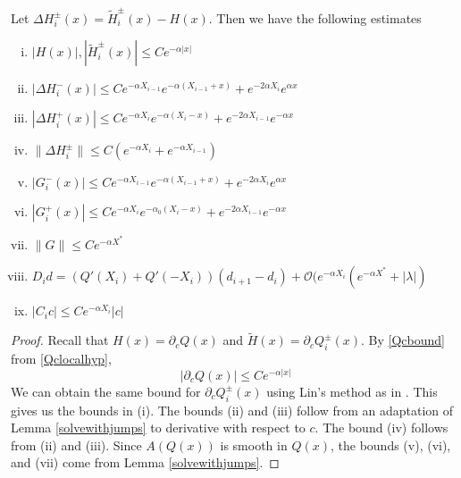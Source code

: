 \documentclass[thesis.tex]{subfiles}
\begin{document}
\begin{lemma}\label{stabestimateslemma}
Let $\Delta H_i^\pm(x) = \tilde{H}_i^\pm(x) - H(x)$. Then we have the following estimates
\begin{enumerate}[(i)]
\item $|H(x)|, |\tilde{H}_i^\pm(x)| \leq C e^{-\alpha |x|}$
\item $|\Delta H_i^-(x)| \leq C e^{-\alpha X_{i-1}} e^{-\alpha(X_{i-1} + x) } + e^{-2 \alpha X_i} e^{\alpha x}$
\item $|\Delta H_i^+(x)| \leq C e^{-\alpha X_i} e^{-\alpha(X_i - x) } + e^{-2 \alpha X_{i-1}} e^{-\alpha x}$
\item $\|\Delta H_i^\pm\| \leq C(e^{-\alpha X_i} + e^{-\alpha X_{i-1}} )$
\item $|G_i^-(x)| \leq C e^{-\alpha X_{i-1}} e^{-\alpha(X_{i-1} + x) } + e^{-2 \alpha X_i} e^{\alpha x}$
\item $|G_i^+(x)| \leq C e^{-\alpha X_i} e^{-\alpha_0(X_i - x) } + e^{-2 \alpha X_{i-1}} e^{-\alpha x}$
\item $\|G\| \leq C e^{-\alpha X^*}$
\item $D_i d = ( Q'(X_i) + Q'(-X_i))(d_{i+1} - d_i ) + \mathcal{O} ( e^{-\alpha X_i} (e^{-\alpha X^*} + |\lambda| )$
\item $|C_i c| \leq C e^{-\alpha X_i} |c|$
\end{enumerate}
\begin{proof}
Recall that $H(x) = \partial_c Q(x)$ and $\tilde{H}(x) = \partial_c Q_i^\pm(x)$. By \cref{Qcbound} from \cref{Qclocalhyp},
\begin{equation}\label{Qcbound1}
|\partial_c Q(x)| \leq C e^{-\alpha|x|}
\end{equation}
We can obtain the same bound for $\partial_c Q_i^\pm(x)$ using Lin's method as in \cite{SandstedeStrut,Sandstede1993}. This gives us the bounds in (i). The bounds (ii) and (iii) follow from an adaptation of Lemma \ref{solvewithjumps} to derivative with respect to $c$. The bound (iv) follows from (ii) and (iii). Since $A(Q(x))$ is smooth in $Q(x)$, the bounds (v), (vi), and (vii) come from Lemma \ref{solvewithjumps}. 


\end{proof}
\end{lemma}
\end{document}
